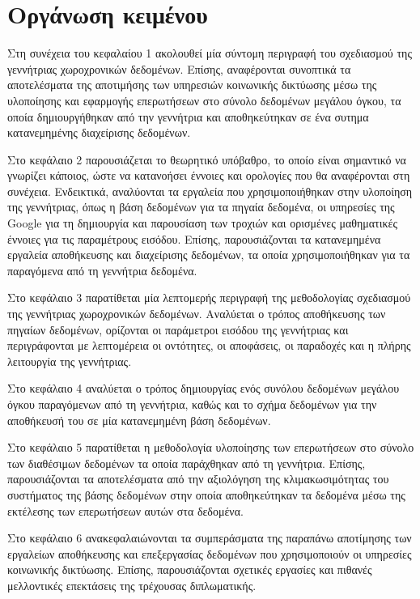\section{Οργάνωση κειμένου}

Στη συνέχεια του κεφαλαίου 1 ακολουθεί μία σύντομη περιγραφή του σχεδιασμού της γεννήτριας χωροχρονικών δεδομένων. Επίσης, αναφέρονται συνοπτικά τα 
αποτελέσματα της αποτιμήσης των υπηρεσιών κοινωνικής δικτύωσης μέσω της υλοποίησης και εφαρμογής επερωτήσεων στο σύνολο δεδομένων μεγάλου όγκου, 
τα οποία δημιουργήθηκαν από την γεννήτρια και αποθηκεύτηκαν σε ένα συτημα κατανεμημένης διαχείρισης δεδομένων.

Στο κεφάλαιο 2 παρουσιάζεται το θεωρητικό υπόβαθρο, το οποίο είναι σημαντικό να γνωρίζει κάποιος, ώστε να κατανοήσει έννοιες και ορολογίες που θα αναφέρονται 
στη συνέχεια. Ενδεικτικά, αναλύονται τα εργαλεία που χρησιμοποιήθηκαν στην υλοποίηση της γεννήτριας, όπως η βάση \linebreak δεδομένων για τα πηγαία δεδομένα, 
οι υπηρεσίες της Google για τη δημιουργία και παρουσίαση των τροχιών και ορισμένες μαθηματικές έννοιες για τις παραμέτρους εισόδου. Επίσης, 
παρουσιάζονται τα κατανεμημένα εργαλεία αποθήκευσης και διαχείρισης δεδομένων, τα οποία χρησιμοποιήθηκαν για τα παραγόμενα από τη γεννήτρια δεδομένα. 

Στο κεφάλαιο 3 παρατίθεται μία λεπτομερής περιγραφή της μεθοδολογίας σχεδιασμού της \linebreak γεννήτριας χωροχρονικών δεδομένων. Αναλύεται ο τρόπος αποθήκευσης των πηγαίων 
δεδομένων, ορίζονται οι παράμετροι εισόδου της γεννήτριας και περιγράφονται με λεπτομέρεια οι οντότητες, οι αποφάσεις, οι παραδοχές και η πλήρης λειτουργία της 
γεννήτριας. 

Στο κεφάλαιο 4 αναλύεται ο τρόπος δημιουργίας ενός συνόλου δεδομένων μεγάλου όγκου \linebreak παραγόμενων από τη γεννήτρια, καθώς και το σχήμα δεδομένων για την αποθήκευσή του 
σε μία κατανεμημένη βάση δεδομένων. 

Στο κεφάλαιο 5 παρατίθεται η μεθοδολογία υλοποίησης των επερωτήσεων στο σύνολο των \linebreak διαθέσιμων δεδομένων τα οποία παράχθηκαν από τη γεννήτρια. Επίσης, 
παρουσιάζονται τα \linebreak αποτελέσματα από την αξιολόγηση της κλιμακωσιμότητας του συστήματος της βάσης δεδομένων στην οποία αποθηκεύτηκαν τα δεδομένα μέσω 
της εκτέλεσης των επερωτήσεων αυτών στα δεδομένα. 

Στο κεφάλαιο 6 ανακεφαλαιώνονται τα συμπεράσματα της παραπάνω αποτίμησης των εργαλείων αποθήκευσης και επεξεργασίας δεδομένων που χρησιμοποιούν 
οι υπηρεσίες κοινωνικής δικτύωσης. Επίσης, παρουσιάζονται σχετικές εργασίες και πιθανές 
μελλοντικές επεκτάσεις της τρέχουσας \linebreak διπλωματικής. 


